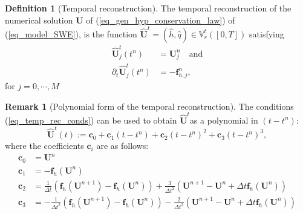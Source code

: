\documentclass[12pt,a4paper]{article}
\numberwithin{equation}{section}
\theoremstyle{definition}
\newcommand{\vect}[1]{\textbf{#1}}
\newcommand{\qp}[1]{\left(#1\right)}
\newcommand{\qb}[1]{\left[#1\right]}
\newcommand{\rect}[1]{\widehat{{\vect{#1}}}^{t}}
\newtheorem{Defn}[subsection]{Definition}
\newtheorem{Rem}[subsection]{Remark}
\begin{document}
\begin{Defn}[Temporal reconstruction]\label{defn_temp_rec_shw}
The temporal reconstruction of the numerical solution $\vect{U}$ of (\ref{eq_gen_hyp_conservation_law}) of (\ref{eq_model_SWE}), is the function $ \widehat{\textbf{U}}^t=\qp{ \widehat{h}, \widehat{q}}\in \mathbb{V}_r^t\qp{\qb{0,T}}$ satisfying 
\begin{equation}\label{eq_temp_rec_conds}
\begin{aligned}
 \widehat{\textbf {U}}_j^t\qp{t^n}&={\textbf{U}}^n_j\quad \text{and}\\
\partial_t \widehat{\textbf{U}}_j^t\qp{t^n}&=-\vect{f}_{h,j}^n,
\end{aligned}
\end{equation}
for $j=0,\cdots,M$
\end{Defn}
\begin{Rem}[Polynomial form of the temporal reconstruction] The conditions (\ref{eq_temp_rec_conds}) can be used to obtain $\rect{U}$as a polynomial in $\qp{t-t^n}$:
	\begin{equation}
		\widehat{\textbf {U}}^t\qp{t}:=\vect{c}_0 +\vect{c}_1\qp{t-t^n} +\vect{c}_2\qp{t-t^n}^2+\vect{c}_3\qp{t-t^n}^3,
	\end{equation}
where the coefficients $\vect{c}_i$ are as follows:
	\begin{equation}
	\begin{aligned}
	\vect{c}_{0} &= \vect{U}^n\\
	\vect{c}_{1}&=-\vect{f}_h\qp{\vect{U}^n} \\
	\vect{c}_{2}&=\frac{1}{\Delta t}\qp{\vect{f}_h\qp{\vect{U}^{n+1}}-\vect{f}_h\qp{\vect{U}^{n}}}+\frac{3}{\Delta t^2}\qp{\vect{U}^{n+1}-\vect{U}^{n}+\Delta t \vect{f}_h\qp{\vect{U}^n}}\\
	\vect{c}_{3}&=-\frac{1}{\Delta t^2}\qp{\vect{f}_h\qp{\vect{U}^{n+1}}-\vect{f}_h\qp{\vect{U}^{n}}}-\frac{2}{\Delta t^3}\qp{\vect{U}^{n+1}-\vect{U}^{n}+\Delta t \vect{f}_h\qp{\vect{U}^n}}\\
	\end{aligned}
	\end{equation}
\end{Rem}
\end{document}
